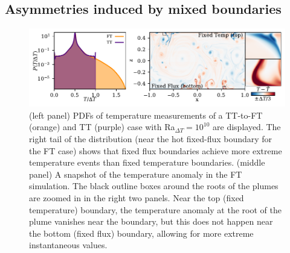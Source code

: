 \documentclass[aps, pre, onecolumn, nofootinbib, notitlepage, groupedaddress, amsfonts, amssymb, amsmath, longbibliography, superscriptaddress]{revtex4-1}
\begin{document}
\subsection{Asymmetries induced by mixed boundaries}
\label{sec:asymmetries}

\begin{figure}
\includegraphics[width=\textwidth]{./figs/rbc_dynamics_asymmetries.pdf}
\caption{ 
	(left panel) PDFs of temperature measurements of a TT-to-FT (orange) and TT (purple) case with Ra$_{\Delta T} = 10^{10}$ are displayed.
	The right tail of the distribution (near the hot fixed-flux boundary for the FT case) shows that fixed flux boundaries achieve more extreme temperature events than fixed temperature boundaries.
	(middle panel) A snapshot of the temperature anomaly in the FT simulation.
	The black outline boxes around the roots of the plumes are zoomed in in the right two panels.
	Near the top (fixed temperature) boundary, the temperature anomaly at the root of the plume vanishes near the boundary, but this does not happen near the bottom (fixed flux) boundary, allowing for more extreme instantaneous values.
\label{fig:rbc_dynamics_asymmetries} }
\end{figure}
\end{document}
